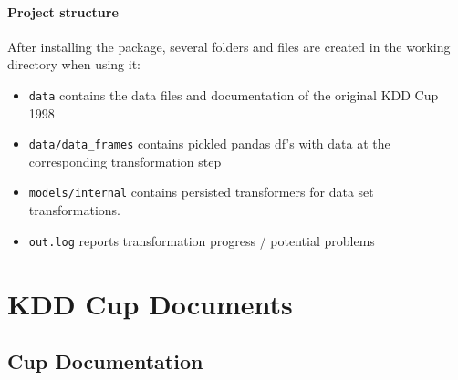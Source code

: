 \documentclass[
  11pt,
  a4paper,
  DIV=12,captions=tableheading,oneside,titlepage]{scrbook}
\providecommand{\tightlist}{%
  \setlength{\itemsep}{0pt}\setlength{\parskip}{0pt}}
\begin{document}
\hypertarget{project-structure}{%
\subsubsection{Project structure}\label{project-structure}}

After installing the package, several folders and files are created in the working directory when using it:

\begin{itemize}
\tightlist
\item
  \texttt{data} contains the data files and documentation of the original KDD Cup 1998
\item
  \texttt{data/data\_frames} contains pickled pandas df's with data at the corresponding transformation step
\item
  \texttt{models/internal} contains persisted transformers for data set transformations.
\item
  \texttt{out.log} reports transformation progress / potential problems
\end{itemize}

\hypertarget{kdd-cup-documents}{%
\chapter{KDD Cup Documents}\label{kdd-cup-documents}}

\hypertarget{data-set-documentation}{%
\section{Cup Documentation}\label{data-set-documentation}}
\end{document}
